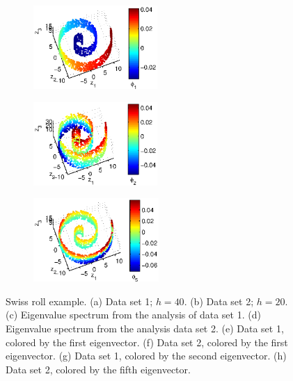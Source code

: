 \documentclass[preprint]{elsarticle}
\begin{document}
\begin{figure}[!th]
\begin{subfigure}{0.45\textwidth}
\caption{}
\label{subfig:swissroll1_color1}
\end{subfigure}
\hfill
\begin{subfigure}{0.45\textwidth}
\centering
\includegraphics[height=1.25in]{swissroll2_color1}
\caption{}
\label{subfig:swissroll2_color1}
\end{subfigure}
\hfill
\begin{subfigure}{0.45\textwidth}
\centering
\includegraphics[height=1.25in]{swissroll1_color2}
\caption{}
\label{subfig:swissroll1_color2}
\end{subfigure}
\hfill
\begin{subfigure}{0.45\textwidth}
\centering
\includegraphics[height=1.25in]{swissroll2_color2}
\caption{}
\label{subfig:swissroll2_color2}
\end{subfigure}
%
\caption{Swiss roll example. (a) Data set 1; $h= 40$. (b) Data set 2; $h = 20$. (c) Eigenvalue spectrum from the analysis of data set 1. (d) Eigenvalue spectrum from the analysis data set 2. (e) Data set 1, colored by the first eigenvector. (f) Data set 2, colored by the first eigenvector. (g) Data set 1, colored by the second eigenvector. (h) Data set 2, colored by the fifth eigenvector. } 
\label{fig:swiss_rolls}	
\end{figure}
\end{document}
